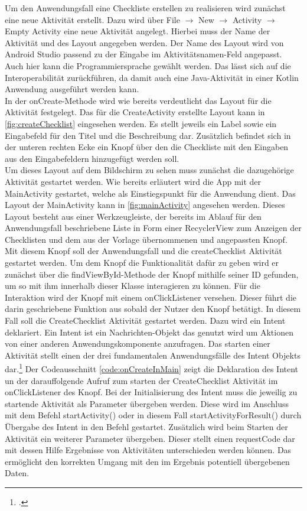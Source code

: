 Um den Anwendungsfall eine Checkliste erstellen zu realisieren wird zunächst eine neue Aktivität erstellt. Dazu wird über File $\rightarrow$ New $\rightarrow$ Activity $\rightarrow$ Empty Activity eine neue Aktivität angelegt. Hierbei muss der Name der Aktivität und des Layout angegeben werden. Der Name des Layout wird von Android Studio passend zu der Eingabe im Aktivitätsnamen-Feld angepasst. Auch hier kann die Programmiersprache gewählt werden. Das lässt sich auf die Interoperabilität zurückführen, da damit auch eine Java-Aktivität in einer Kotlin Anwendung ausgeführt werden kann.\\
In der onCreate-Methode wird wie bereits verdeutlicht das Layout für die Aktivität festgelegt. Das für die CreateActivity erstellte Layout kann in \autoref{fig:createChecklist} eingesehen werden. Es stellt jeweils ein Label sowie ein Eingabefeld für den Titel und die Beschreibung dar. Zusätzlich befindet sich in der unteren rechten Ecke ein Knopf über den die Checkliste mit den Eingaben aus den Eingabefeldern hinzugefügt werden soll.\\
Um dieses Layout auf dem Bildschirm zu sehen muss zunächst die dazugehörige Aktivität gestartet werden. Wie bereits erläutert wird die App mit der MainActivity gestartet, welche als Einstiegspunkt für die Anwendung dient. Das Layout der MainActivity kann in \autoref{fig:mainActivity} angesehen werden. Dieses Layout besteht aus einer Werkzeugleiste, der bereits im Ablauf für den Anwendungsfall beschriebene Liste in Form einer RecyclerView zum Anzeigen der Checklisten und dem aus der Vorlage übernommenen und angepassten Knopf. Mit diesem Knopf soll der Anwendungsfall und die createChecklist Aktivität gestartet werden. Um dem Knopf die Funktionalität dafür zu geben wird er zunächst über die findViewById-Methode der Knopf mithilfe seiner ID gefunden, um so mit ihm innerhalb dieser Klasse interagieren zu können. Für die Interaktion wird der Knopf mit einem onClickListener versehen. Dieser führt die darin geschriebene Funktion aus sobald der Nutzer den Knopf betätigt. In diesem Fall soll die CreateChecklist Aktivität gestartet werden. Dazu wird ein Intent deklariert. Ein Intent ist ein Nachrichten-Objekt das genutzt wird um Aktionen von einer anderen Anwendungskomponente anzufragen. Das starten einer Aktivität stellt einen der drei fundamentalen Anwendungsfälle des Intent Objekts dar.\footcite{Intents.2021} Der Codeausschnitt \autoref{code:onCreateInMain} zeigt die Deklaration des Intent un der darauffolgende Aufruf zum starten der CreateChecklist Aktivität im onClickListener des Knopf. Bei der Initialisierung des Intent muss die jeweilig zu startende Aktivität als Parameter übergeben werden. Diese wird im Anschluss mit dem Befehl startActivity() oder in diesem Fall startActivityForResult() durch Übergabe des Intent in den Befehl gestartet. Zusätzlich wird beim Starten der Aktivität ein weiterer Parameter übergeben. Dieser stellt einen requestCode dar mit dessen Hilfe Ergebnisse von Aktivitäten unterschieden werden können. Das ermöglicht den korrekten Umgang mit den im Ergebnis potentiell übergebenen Daten.
